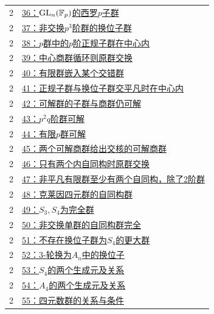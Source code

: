 \documentclass[UTF8,a4paper,11pt,fontset=windows]{ctexart}
\DeclareMathOperator{\GL}{GL}\DeclareMathOperator{\SL}{SL}
\begin{document}
\begin{longtable}{cp{13.5cm}}
2 & \hyperref[ex:2:36]{36：$\GL_n(\F_p)$的西罗$p$子群}\\

2 & \hyperref[ex:2:37]{37：非交换$p^3$阶群的换位子群}\\

2 & \hyperref[ex:2:38]{38：$p$群中的$p$阶正规子群在中心内}\\

2 & \hyperref[ex:2:39]{39：中心商群循环则原群交换}\\

2 & \hyperref[ex:2:40]{40：有限群嵌入某个交错群}\\

2 & \hyperref[ex:2:41]{41：正规子群与换位子群交平凡时在中心内}\\

2 & \hyperref[ex:2:42]{42：可解群的子群与商群仍可解}\\

2 & \hyperref[ex:2:43]{43：$p^2q$阶群可解}\\

2 & \hyperref[ex:2:44]{44：有限$p$群可解}\\

2 & \hyperref[ex:2:45]{45：两个可解商群给出交核的可解商群}\\

2 & \hyperref[ex:2:46]{46：只有两个内自同构时原群交换}\\

2 & \hyperref[ex:2:47]{47：非平凡有限群至少有两个自同构，除了2阶群}\\

2 & \hyperref[ex:2:48]{48：克莱因四元群的自同构群}\\

2 & \hyperref[ex:2:49]{49：$S_3,S_4$为完全群}\\

2 & \hyperref[ex:2:50]{50：非交换单群的自同构群完全}\\

2 & \hyperref[ex:2:51]{51：不存在换位子群为$S_4$的更大群}\\

2 & \hyperref[ex:2:52]{52：3-轮换为$A_n$中的换位子}\\

2 & \hyperref[ex:2:53]{53：$S_4$的两个生成元及关系}\\

2 & \hyperref[ex:2:54]{54：$A_4$的两个生成元及关系}\\

2 & \hyperref[ex:2:55]{55：四元数群的关系与条件}\\


\end{longtable}
\end{document}
